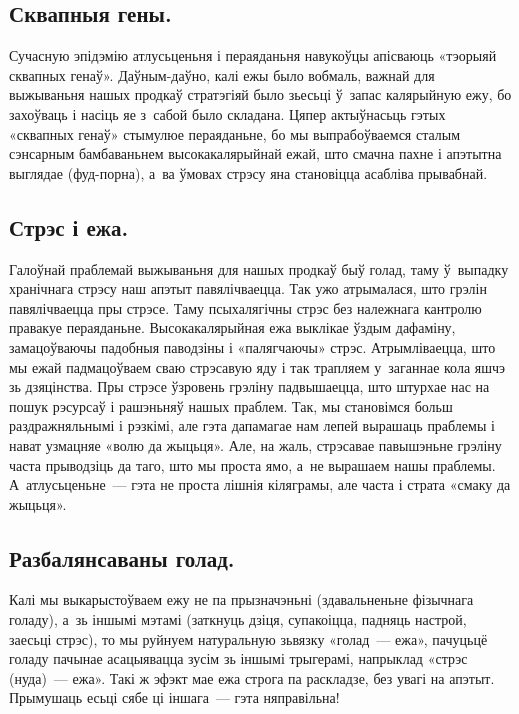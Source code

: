 \subsection{Сквапныя гены.}
Сучасную эпідэмію атлусьценьня і пераяданьня навукоўцы апісваюць «тэорыяй сквапных генаў». Даўным-даўно, калі ежы было вобмаль, важнай для выжываньня нашых продкаў стратэгіяй было зьесьці ў~запас калярыйную ежу, бо захоўваць і насіць яе з~сабой было складана. Цяпер актыўнасьць гэтых «сквапных генаў» стымулюе пераяданьне, бо мы выпрабоўваемся сталым сэнсарным бамбаваньнем высокакалярыйнай ежай, што смачна пахне і апэтытна выглядае (фуд-порна), а~ва ўмовах стрэсу яна становіцца асабліва прывабнай.

\subsection{Стрэс і ежа.}
Галоўнай праблемай выжываньня для нашых продкаў быў голад, таму ў~выпадку хранічнага стрэсу наш апэтыт павялічваецца. Так ужо атрымалася, што грэлін павялічваецца пры стрэсе. Таму псыхалягічны стрэс без належнага кантролю правакуе пераяданьне. Высокакалярыйная ежа выклікае ўздым дафаміну, замацоўваючы падобныя паводзіны і «палягчаючы» стрэс. Атрымліваецца, што мы ежай падмацоўваем сваю стрэсавую яду і так трапляем у~заганнае кола яшчэ зь дзяцінства. Пры стрэсе ўзровень грэліну падвышаецца, што штурхае нас на пошук рэсурсаў і рашэньняў нашых праблем. Так, мы становімся больш раздражняльнымі і рэзкімі, але гэта дапамагае нам лепей вырашаць праблемы і нават узмацняе «волю да жыцьця». Але, на жаль, стрэсавае павышэньне грэліну часта прыводзіць да таго, што мы проста ямо, а~не вырашаем нашы праблемы. А~атлусьценьне~--- гэта не проста лішнія кіляграмы, але часта і страта «смаку да жыцьця».

\subsection{Разбалянсаваны голад.}
Калі мы выкарыстоўваем ежу не па прызначэньні (здавальненьне фізычнага голаду), а~зь іншымі мэтамі (заткнуць дзіця, супакоіцца, падняць настрой, заесьці стрэс), то мы руйнуем натуральную зьвязку «голад~--- ежа», пачуцьцё голаду пачынае асацыявацца зусім зь іншымі трыгерамі, напрыклад «стрэс (нуда)~--- ежа». Такі ж эфэкт мае ежа строга па раскладзе, без увагі на апэтыт. Прымушаць есьці сябе ці іншага~--- гэта няправільна!


